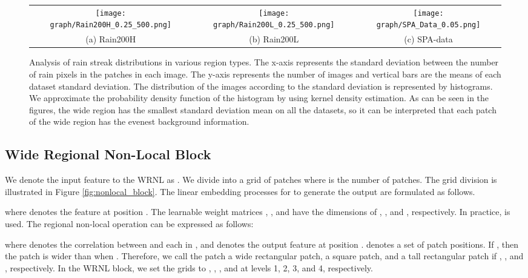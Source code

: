 \documentclass[a4paper,fleqn]{cas-dc}
\begin{document}
\begin{figure*}[!t]\footnotesize
	\centering
	\setlength{\tabcolsep}{0pt}
	
	\begin{tabular}{cclcclccl}
		\multicolumn{3}{c}{\texttt{[image: graph/Rain200H\_0.25\_500.png]}} &
		\multicolumn{3}{c}{\texttt{[image: graph/Rain200L\_0.25\_500.png]}} &
		\multicolumn{3}{c}{\texttt{[image: graph/SPA\_Data\_0.05.png]}}
		\\
		\multicolumn{3}{c}{(a) Rain200H \cite{yang2017deep}} &
		\multicolumn{3}{c}{(b) Rain200L \cite{yang2017deep}} &
		\multicolumn{3}{c}{(c) SPA-data \cite{wang2019spatial}}
	\end{tabular}
	\caption{Analysis of rain streak distributions in various region types. The x-axis represents the standard deviation between the number of rain pixels in the patches in each image. The y-axis represents the number of images and vertical bars are the means of each dataset standard deviation. The distribution of the images according to the standard deviation is represented by histograms. We approximate the probability density function of the histogram by using kernel density estimation. As can be seen in the figures, the wide region has the smallest standard deviation mean on all the datasets, so it can be interpreted that each patch of the wide region has the evenest background information.}

	\label{fig:rain distribution}
\end{figure*}


\subsection{Wide Regional Non-Local Block}



We denote the input feature to the WRNL as . We divide  into a  grid of patches  where  is the number of patches. The grid division is illustrated in Figure \ref{fig:nonlocal_block}. The linear embedding processes for  to generate the output  are formulated as follows. 


where  denotes the feature  at position . The learnable weight matrices , , and  have the dimensions of , , and , respectively. In practice,   is used. The regional non-local operation can be expressed as follows: 

where  denotes the correlation between  and each  in , and  denotes the output feature  at position .  denotes a set of patch positions. If , then the patch is wider than when . Therefore, we call the patch a wide rectangular patch, a square patch, and a tall rectangular patch if  , , and , respectively. In the WRNL block, we set the  grids to  , , , and  at levels 1, 2, 3, and 4, respectively. 
\end{document}
